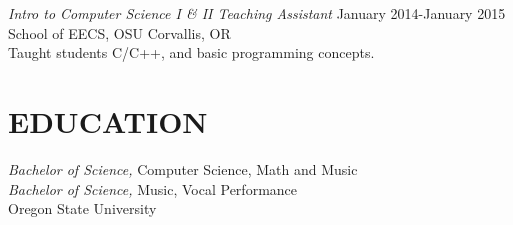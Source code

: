\documentclass[line,margin]{res}
\begin{document}
\begin{resume}
                    {\sl Intro to Computer Science I \& II Teaching Assistant} \hfill January 2014-January 2015\\
                    School of EECS, OSU
                    Corvallis, OR\\
                    Taught students C/C++, and basic programming concepts.
 
\section{EDUCATION}
                    {\sl Bachelor of Science,} Computer Science, Math and Music \\
                    {\sl Bachelor of Science,} Music, Vocal Performance \\
                    Oregon State University\\
                   
\end{resume}
\end{document}
